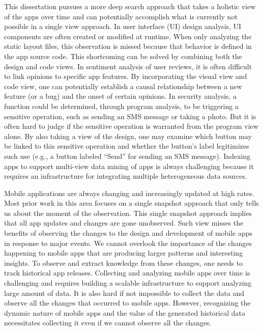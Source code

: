 This dissertation pursues a more deep search approach that takes a holistic view of the apps over time and can potentially accomplish what is currently not possible in a single view approach.
In user interface (UI) design analysis, UI components are often created or modified at runtime.
When only analyzing the static layout files, this observation is missed because that behavior is defined in the app source code.
This shortcoming can be solved by combining both the design and code views.
In sentiment analysis of user reviews, it is often difficult to link opinions to specific app features.
By incorporating the visual view and code view, one can potentially establish a causal relationship between a new feature (or a bug) and the onset of certain opinions.
In security analysis, a function could be determined, through program analysis, to be triggering a sensitive operation, such as sending an SMS message or taking a photo.
But it is often hard to judge if the sensitive operation is warranted from the program view alone.
By also taking a view of the design, one may examine which button may be linked to this sensitive operation and whether the button's label legitimizes such use (e.g., a button labeled ``Send'' for sending an SMS message).
Indexing apps to support multi-view data mining of apps is always challenging because it requires an infrastructure for integrating multiple heterogeneous data sources.

Mobile applications are always changing and increasingly updated at high rates.
Most prior work in this area focuses on a single snapshot approach that only tells us about the moment of the observation.
This single snapshot approach implies that all app updates and changes are gone unobserved.
Such view misses the benefits of observing the changes to the design and development of mobile apps in response to major events.
We cannot overlook the importance of the changes happening to mobile apps that are producing larger patterns and interesting insights.
To observe and extract knowledge from these changes, one needs to track historical app releases.
Collecting and analyzing mobile apps over time is challenging and requires building a scalable infrastructure to support analyzing large amount of data.
It is also hard if not impossible to collect the data and observe all the changes that occurred to mobile apps.
However, recognizing the dynamic nature of mobile apps and the value of the generated historical data necessitates collecting it even if we cannot observe all the changes.

